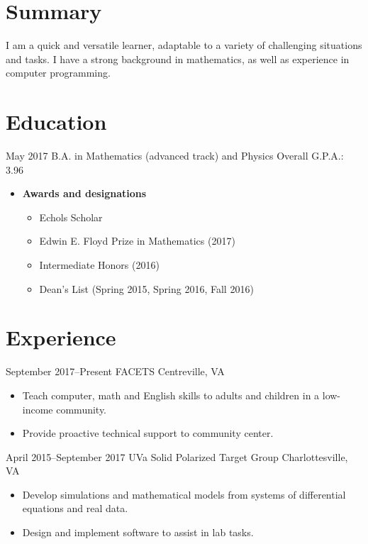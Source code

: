 \documentclass[10pt]{article}
\begin{document}


\section*{Summary}
I am a quick and versatile learner, adaptable to a variety of
challenging situations and tasks. I have a strong background in
mathematics, as well as experience in computer programming.

\section*{Education}
{May 2017}
{B.A. in Mathematics (advanced track) and Physics}
{Overall G.P.A.: 3.96}
\begin{itemize}
\item \textbf{Awards and designations}
  \begin{itemize}
  \item Echols Scholar
  \item Edwin E. Floyd Prize in Mathematics (2017)
  \item Intermediate Honors (2016)
  \item Dean's List (Spring 2015, Spring 2016, Fall 2016)
  \end{itemize}
\end{itemize}

\section*{Experience}
{September 2017--Present}
{FACETS}
{Centreville, VA}
\begin{itemize}
\item Teach computer, math and English skills to adults and children in a
  low-income community.
\item Provide proactive technical support to community center.
\end{itemize}

{April 2015--September 2017}
{UVa Solid Polarized Target Group}
{Charlottesville, VA}
\begin{itemize}
\item Develop simulations and mathematical models from systems of differential
  equations and real data.
\item Design and implement software to assist in lab tasks.
\end{itemize}
\end{document}
